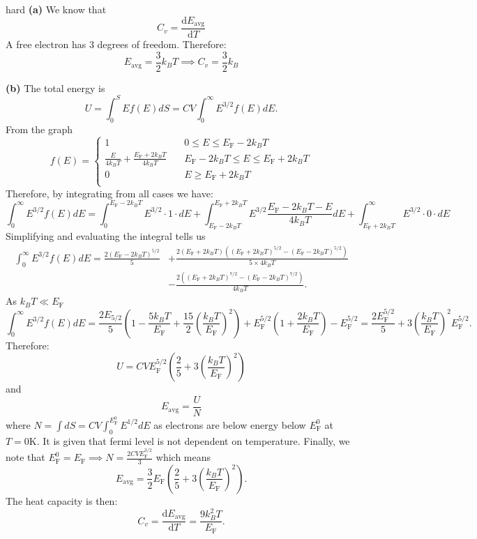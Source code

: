 \begin{solution}{hard}
\textbf{(a)} We know that $$C_v = \frac{\text{d}E_{\text{avg}}}{\text{d}T}$$
A free electron has $3$ degrees of freedom. Therefore: $$E_{\text{avg}} = \frac{3}{2} k_BT\implies C_v = \frac{3}{2} k_B$$
\vspace{3mm}

\noindent \textbf{(b)} The total energy is 
$$U = \int_0^S Ef(E) dS = CV\int_0^{\infty}E^{3/2}f(E) dE.$$
From the graph
$$ f(E) =
\begin{cases}
1 &\quad 0 \leq E \leq E_{\text{F}}- 2k_BT \\
\frac{E}{4k_BT} + \frac{E_{\text{F}}+ 2k_BT}{4k_BT} &\quad E_{\text{F}}- 2k_BT\leq E \leq E_{\text{F}}+ 2k_BT\\
0 &\quad E \geq E_{\text{F}}+ 2k_BT \\
\end{cases} $$
Therefore, by integrating from all cases we have:
$$ \int_0^{\infty} E^{3/2} f(E) dE = \int_0^{E_{\text{F}}- 2k_BT} E^{3/2} \cdot 1 \cdot dE + \int _{E_{\text{F}}- 2k_BT}^{E_{\text{F}}+2k_BT} E^{3/2}\frac{E_{\text{F}}- 2k_BT-E}{4k_BT} dE + \int_{E_{\text{F}}+2k_BT}^{\infty} E^{3/2}\cdot 0 \cdot dE$$
Simplifying and evaluating the integral tells us 
\begin{align*}\int_0^{\infty} E^{3/2} f(E) dE = \frac{2\left(E_{\text{F}}- 2k_BT\right)^{5/2}}{5} &+ \frac{2\left(E_{\text{F}}+ 2k_BT\right)\left(\left(E_{\text{F}}+2k_BT\right)^{5/2}-\left(E_{\text{F}}- 2k_BT\right)^{5/2}\right)}{5\times 4k_BT} \\
&- \frac{2\left(\left(E_{\text{F}}+2k_BT\right)^{7/2} - \left(E_{\text{F}}- 2k_BT\right)^{7/2}\right)}{4k_BT}.\end{align*}
As $k_BT \ll E_{\text{F}}$
$$\int_0^{\infty} E^{3/2}f(E)dE = \frac{2E_{\text{5/2}}}{5} \left( 1 - \frac{5k_BT}{E_{\text{F}}} + \frac{15}{2} \left(\frac{k_BT}{E_{\text{F}}}\right)^2\right) + E_{\text{F}}^{5/2}\left(1+ \frac{2k_BT}{E_{\text{F}}}\right)- E_{\text{F}}^{5/2} = \frac{2E_{\text{F}}^{5/2}}{5} + 3 \left(\frac{k_BT}{E_{\text{F}}}\right)^2E_{\text{F}}^{5/2}.$$
Therefore:
$$U = CVE_{\text{F}}^{5/2} \left( \frac{2}{5} + 3 \left( \frac{k_BT}{E_{\text{F}}}\right)^2\right)$$
and
$$E_{\text{avg}} = \frac{U}{N}$$ where $ N = \int dS = CV \int_0^{E_{\text{F}}^0} E^{1/2} dE$ as electrons are below energy below $E_{\text{F}}^0$ at $T = 0$K. It is given that fermi level is not dependent on temperature. Finally, we note that
 $E_{\text{F}}^0= E_{\text{F}} \implies N = \frac{2CV E_{\text{F}}^{3/2}}{3}$
 which means
$$E_{\text{avg}} = \frac{3}{2} E_{\text{F}} \left( \frac{2}{5} + 3 \left( \frac{k_BT}{E_{\text{F}}}\right)^2\right).$$
The heat capacity is then:
$$C_v = \frac{\text{d}E_{\text{avg}}}{\text{d}T} = \frac{9k_B^2T}{E_{\text{F}}}.$$
\end{solution}